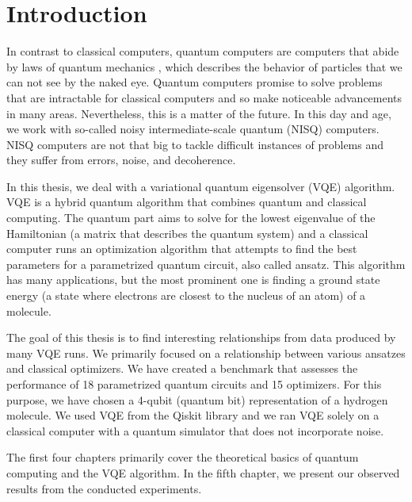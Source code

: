\chapter*{Introduction}

In contrast to classical computers, quantum computers are computers that abide by laws of quantum mechanics , which describes the behavior of particles that we can not see by the naked eye. Quantum computers promise to solve problems that are intractable for classical computers \cite{Peruzzo} and so make noticeable advancements in many areas. Nevertheless, this is a matter of the future. In this day and age, we work with so-called noisy intermediate-scale quantum (NISQ) computers. NISQ computers are not that big to tackle difficult instances of problems and they suffer from errors, noise, and decoherence.

In this thesis, we deal with a variational quantum eigensolver (VQE) algorithm. VQE is a hybrid quantum algorithm that combines quantum and classical computing. The quantum part aims to solve for the lowest eigenvalue  of the Hamiltonian (a matrix that describes the quantum system) and a classical computer runs an optimization algorithm that attempts to find the best parameters for a parametrized quantum circuit, also called ansatz. This algorithm has many applications, but the most prominent one is finding a ground state energy (a state where electrons are closest to the nucleus of an atom) of a molecule.

The goal of this thesis is to find interesting relationships from data produced by many VQE runs. We primarily focused on a relationship between various ansatzes and classical optimizers.  We have created a benchmark  that assesses the performance of 18 parametrized quantum circuits and 15 optimizers. For this purpose, we have chosen a 4-qubit (quantum bit) representation of a hydrogen molecule. We used VQE from the Qiskit library and we ran VQE solely on a classical computer with a quantum simulator that does not incorporate noise.


The first four chapters primarily cover the theoretical basics of quantum computing and the VQE algorithm. In the fifth chapter, we present our observed results from the conducted experiments.

